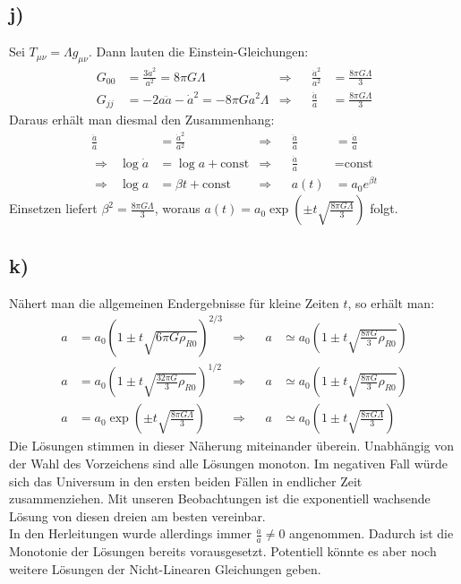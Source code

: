 \documentclass[a4paper,12pt]{article}
\newcommand{\kla}{}
\newcommand{\tecxt}{}
\begin{document}
\subsection*{j)}Sei $T_{\mu\nu}=\Lambda g_{\mu\nu}$. Dann lauten die Einstein-Gleichungen:
\begin{align*}
G_{00}&=\frac{3\dot{a}^2}{a^2}=8\pi G\Lambda &\Rightarrow &&\frac{\dot{a}^2}{a^2}&=\frac{8\pi G\Lambda}{3}\\
G_{jj}&=-2a\ddot{a}-\dot{a}^2=-8\pi Ga^2\Lambda&\Rightarrow &&\frac{\ddot{a}}{a}&=\frac{8\pi G\Lambda}{3}
\end{align*}
Daraus erhält man diesmal den Zusammenhang:
\begin{align*}
\frac{\ddot{a}}{a}&=\frac{\dot{a}^2}{a^2}&\Rightarrow &&\frac{\ddot{a}}{\dot{a}}&=\frac{\dot{a}}{a}\\
\Rightarrow\ \ \ \log\dot{a}&=\log a+\tecxt\text{const}&\Rightarrow &&\frac{\dot{a}}{a}&=\tecxt\text{const}\\
\Rightarrow\ \ \ \log a&=\beta t+\tecxt\text{const}&\Rightarrow &&a(t)&=a_0e^{\beta t}
\end{align*}
Einsetzen liefert $\beta^2=\frac{8\pi G\Lambda}{3}$, woraus $a(t)=a_0\exp\kla\left( {\pm t\sqrt{\frac{8\pi G\Lambda}{3}}} \right)$ folgt.
\subsection*{k)}
Nähert man die allgemeinen Endergebnisse für kleine Zeiten $t$, so erhält man:
\begin{align*}
a&=a_0\kla\left( {1\pm t\sqrt{6\pi G\rho_{R0}}} \right)^{2/3}&\Rightarrow &&a&\simeq a_0\kla\left( {1\pm t\sqrt{\frac{8\pi G}{3}\rho_{R0}}} \right)\\
a&=a_0\kla\left( {1\pm t\sqrt{\frac{32\pi G}{3}\rho_{R0}}} \right)^{1/2}&\Rightarrow &&a&\simeq a_0\kla\left( {1\pm t\sqrt{\frac{8\pi G}{3}\rho_{R0}}} \right)\\
a&=a_0\exp\kla\left( {\pm t\sqrt{\frac{8\pi G\Lambda}{3}}} \right)&\Rightarrow &&a&\simeq a_0\kla\left( {1\pm t\sqrt{\frac{8\pi G\Lambda}{3}}} \right)
\end{align*}
Die Lösungen stimmen in dieser Näherung miteinander überein. Unabhängig von der Wahl des Vorzeichens sind alle Lösungen monoton. Im negativen Fall würde sich das Universum in den ersten beiden Fällen in endlicher Zeit zusammenziehen. Mit unseren Beobachtungen ist die exponentiell wachsende Lösung von diesen dreien am besten vereinbar.\\ 
In den Herleitungen wurde allerdings immer $\frac{\dot{a}}{a}\neq 0$ angenommen. Dadurch ist die Monotonie der Lösungen bereits vorausgesetzt. Potentiell könnte es aber noch weitere Lösungen der Nicht-Linearen Gleichungen geben.
\end{document}
